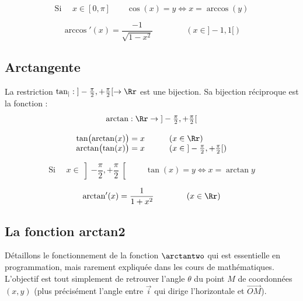 \documentclass[11pt,class=report,crop=false]{standalone}
\begin{document}
$$\text{Si } \quad x\in [0,\pi] \qquad \cos(x)=y \iff x = \arccos(y)$$

$$\arccos'(x) = \frac{-1}{\sqrt{1-x^2}} \qquad\qquad (x \in {}]-1,1[)$$

\subsection{Arctangente}

La restriction $\tan_| : {}]-\tfrac\pi2,+\tfrac\pi2[ \to \Rr$
est une bijection.
Sa bijection réciproque est la fonction  :
$$\arctan : \Rr \to {}]-\tfrac\pi2,+\tfrac\pi2[$$

\begin{center}
	\begin{minipage}{0.45\textwidth}
	\end{minipage}\qquad
	\begin{minipage}{0.35\textwidth}
	\end{minipage}
\end{center}



$$
\begin{array}{cl}
	\displaystyle \tan\bigl(\arctan(x)\bigr) = x &  \qquad (x \in \Rr)\\
	\displaystyle \arctan\bigl(\tan(x)\bigr) = x &  \qquad (x \in {}]-\frac\pi2,+\frac\pi2[) \\
\end{array}
$$

$$\text{Si } \quad x\in \left]-\frac\pi2,+\frac\pi2\right[ \qquad \tan(x)=y \iff x = \arctan y$$


$$\arctan'(x) = \frac{1}{1+x^2} \qquad \qquad (x \in \Rr)$$

\subsection{La fonction arctan2}

 
Détaillons le fonctionnement de la fonction $\arctantwo$ qui est essentielle en programmation, mais rarement expliquée dans les cours de mathématiques. L'objectif est tout simplement de retrouver l'angle $\theta$ du point $M$ de coordonnées $(x,y)$ (plus précisément l'angle entre $\vec i$ qui dirige l'horizontale et $\vec{OM}$).
\end{document}

